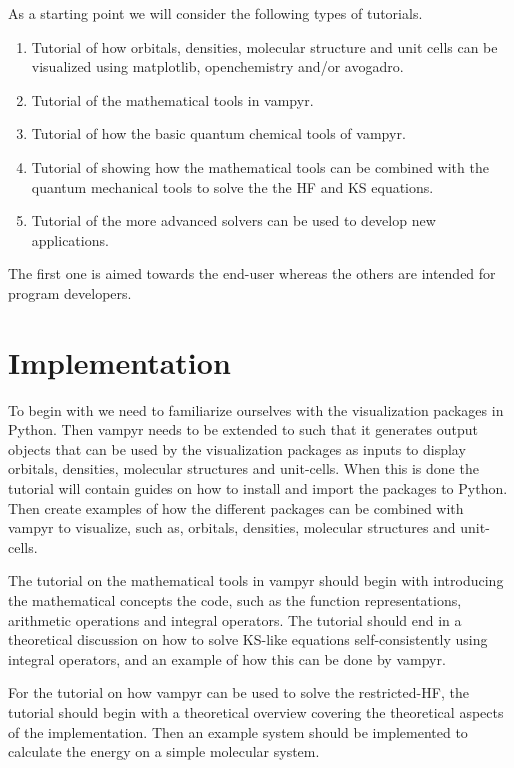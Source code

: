 \documentclass[12pt]{article}
\begin{document}
As a starting point we will consider the following types of tutorials.

\begin{enumerate}
    \item Tutorial of how orbitals, densities, molecular structure and unit cells
    can be visualized using matplotlib, openchemistry and/or avogadro.
    \item Tutorial of the mathematical tools in \ac{vampyr}.
    \item Tutorial of how the basic quantum chemical tools of \ac{vampyr}.
    \item Tutorial of showing how the mathematical tools can be combined
    with the quantum mechanical tools to solve the
    the \ac{HF} and \ac{KS} equations.
    \item Tutorial of the more advanced solvers can be used to develop new
    applications.
\end{enumerate}

The first one is aimed towards the end-user whereas the others are intended
for program developers.

\section{Implementation}

To begin with we need to familiarize ourselves with the visualization packages in
Python.
Then \ac{vampyr} needs to be extended to such that it generates output objects
that can be used by the visualization packages as inputs to display orbitals,
densities, molecular structures and unit-cells. When this is done the tutorial
will contain guides on how to install and import the packages to Python.
Then create examples of how the different
packages can be combined with \ac{vampyr} to visualize, such as, orbitals,
densities, molecular structures and unit-cells.

The tutorial on the mathematical tools in \ac{vampyr} should begin
with introducing the mathematical concepts the code, such as
the function representations, arithmetic operations and integral
operators. The tutorial should end in a theoretical discussion
on how to solve \ac{KS}-like equations self-consistently using
integral operators, and an example of how this can be done
by \ac{vampyr}.

For the tutorial on how \ac{vampyr} can be used to solve the restricted-\ac{HF},
the tutorial should begin with a theoretical overview covering the theoretical
aspects of the implementation. Then an example system should be implemented
to calculate the energy on a simple molecular system.
\end{document}
